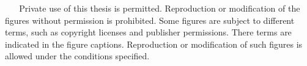 {%
  \copyrighttext%
  {\copyrightmetastring\ \allrightsreservedeng}%
  {%
    \copyrightstring\ \allrightsreservedeng
    \blockpar
    Private use of this thesis is permitted. Reproduction or
    modification of the figures without permission is prohibited.
    \blockpar
    Some figures are subject to different terms, such as copyright
    licenses and publisher permissions. There terms are indicated in
    the figure captions. Reproduction or modification of such figures
    is allowed under the conditions specified.
  }
}
